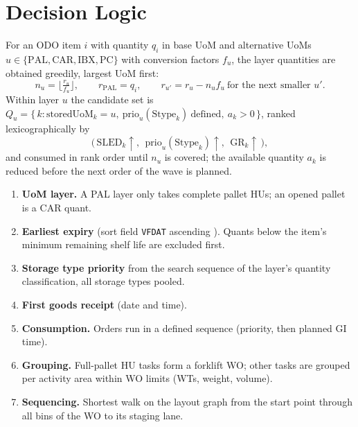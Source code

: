 \documentclass[11pt,a4paper]{article}
\begin{document}
\section{Decision Logic}
\label{sec:logic}
For an ODO item $i$ with quantity $q_i$ in base UoM and alternative UoMs $u \in \{\mathrm{PAL},\mathrm{CAR},\mathrm{IBX},\mathrm{PC}\}$
with conversion factors $f_u$, the layer quantities are obtained greedily, largest UoM first:
\begin{equation}
n_u = \Big\lfloor \tfrac{r_u}{f_u} \Big\rfloor, \qquad r_{\mathrm{PAL}} = q_i, \qquad r_{u'} = r_u - n_u f_u \ \text{for the next smaller } u'.
\end{equation}
Within layer $u$ the candidate set is $Q_u = \{\,k : \mathrm{storedUoM}_k = u,\ \mathrm{prio}_u(\mathrm{Stype}_k)\ \text{defined},\ a_k > 0\,\}$,
ranked lexicographically by
\begin{equation}
\big(\,\mathrm{SLED}_k\uparrow,\ \ \mathrm{prio}_u(\mathrm{Stype}_k)\uparrow,\ \ \mathrm{GR}_k\uparrow\,\big),
\end{equation}
and consumed in rank order until $n_u$ is covered; the available quantity $a_k$ is reduced before the next order of the wave is planned.

\begin{enumerate}[leftmargin=*,itemsep=2pt]
\item \textbf{UoM layer.} A PAL layer only takes complete pallet HUs; an opened pallet is a CAR quant.
\item \textbf{Earliest expiry} (sort field \texttt{VFDAT} ascending \cite{vfdat}). Quants below the item's minimum remaining shelf life are excluded first.
\item \textbf{Storage type priority} from the search sequence of the layer's quantity classification, all storage types pooled.
\item \textbf{First goods receipt} (date and time).
\item \textbf{Consumption.} Orders run in a defined sequence (priority, then planned GI time).
\item \textbf{Grouping.} Full-pallet HU tasks form a forklift WO; other tasks are grouped per activity area within WO limits (WTs, weight, volume).
\item \textbf{Sequencing.} Shortest walk on the layout graph from the start point through all bins of the WO to its staging lane.
\end{enumerate}
\end{document}
